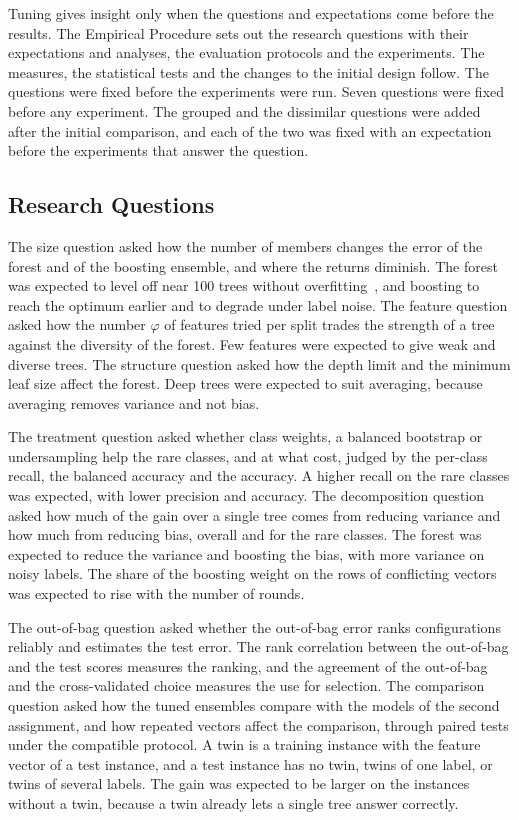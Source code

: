 \documentclass[10pt,conference]{IEEEtran}
\begin{document}
Tuning gives insight only when the questions and expectations come before the results. The Empirical Procedure sets out the research questions with their expectations and analyses, the evaluation protocols and the experiments. The measures, the statistical tests and the changes to the initial design follow. The questions were fixed before the experiments were run. Seven questions were fixed before any experiment. The grouped and the dissimilar questions were added after the initial comparison, and each of the two was fixed with an expectation before the experiments that answer the question.

\subsection{Research Questions}
\label{sec:procedure-questions}

The size question asked how the number of members changes the error of the forest and of the boosting ensemble, and where the returns diminish. The forest was expected to level off near 100 trees without overfitting~\cite{breiman2001}, and boosting to reach the optimum earlier and to degrade under label noise. The feature question asked how the number $\varphi$ of features tried per split trades the strength of a tree against the diversity of the forest. Few features were expected to give weak and diverse trees. The structure question asked how the depth limit and the minimum leaf size affect the forest. Deep trees were expected to suit averaging, because averaging removes variance and not bias.

The treatment question asked whether class weights, a balanced bootstrap or undersampling help the rare classes, and at what cost, judged by the per-class recall, the balanced accuracy and the accuracy. A higher recall on the rare classes was expected, with lower precision and accuracy. The decomposition question asked how much of the gain over a single tree comes from reducing variance and how much from reducing bias, overall and for the rare classes. The forest was expected to reduce the variance and boosting the bias, with more variance on noisy labels. The share of the boosting weight on the rows of conflicting vectors was expected to rise with the number of rounds.

The out-of-bag question asked whether the out-of-bag error ranks configurations reliably and estimates the test error. The rank correlation between the out-of-bag and the test scores measures the ranking, and the agreement of the out-of-bag and the cross-validated choice measures the use for selection. The comparison question asked how the tuned ensembles compare with the models of the second assignment, and how repeated vectors affect the comparison, through paired tests under the compatible protocol. A twin is a training instance with the feature vector of a test instance, and a test instance has no twin, twins of one label, or twins of several labels. The gain was expected to be larger on the instances without a twin, because a twin already lets a single tree answer correctly.
\end{document}
